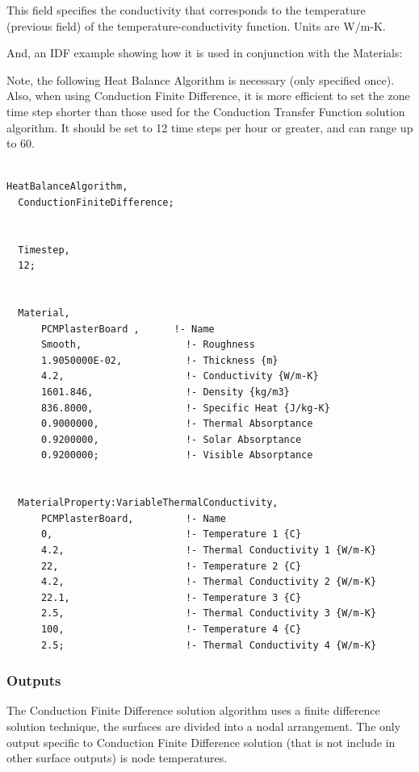 This field specifies the conductivity that corresponds to the temperature (previous field) of the temperature-conductivity function. Units are W/m-K.

And, an IDF example showing how it is used in conjunction with the Materials:

Note, the following Heat Balance Algorithm is necessary (only specified once). Also, when using Conduction Finite Difference, it is more efficient to set the zone time step shorter than those used for the Conduction Transfer Function solution algorithm. It should be set to 12 time steps per hour or greater, and can range up to 60.

\begin{lstlisting}

HeatBalanceAlgorithm,
  ConductionFiniteDifference;


  Timestep,
  12;


  Material,
      PCMPlasterBoard ,      !- Name
      Smooth,                  !- Roughness
      1.9050000E-02,           !- Thickness {m}
      4.2,                     !- Conductivity {W/m-K}
      1601.846,                !- Density {kg/m3}
      836.8000,                !- Specific Heat {J/kg-K}
      0.9000000,               !- Thermal Absorptance
      0.9200000,               !- Solar Absorptance
      0.9200000;               !- Visible Absorptance


  MaterialProperty:VariableThermalConductivity,
      PCMPlasterBoard,         !- Name
      0,                       !- Temperature 1 {C}
      4.2,                     !- Thermal Conductivity 1 {W/m-K}
      22,                      !- Temperature 2 {C}
      4.2,                     !- Thermal Conductivity 2 {W/m-K}
      22.1,                    !- Temperature 3 {C}
      2.5,                     !- Thermal Conductivity 3 {W/m-K}
      100,                     !- Temperature 4 {C}
      2.5;                     !- Thermal Conductivity 4 {W/m-K}
\end{lstlisting}

\subsubsection{Outputs}\label{outputs-1-026}

The Conduction Finite Difference solution algorithm uses a finite difference solution technique, the surfaces are divided into a nodal arrangement. The only output specific to Conduction Finite Difference solution (that is not include in other surface outputs) is node temperatures.

